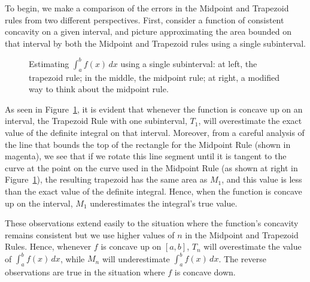 To begin, we make a comparison of the errors in the Midpoint and Trapezoid rules from two different perspectives.  First, consider a function of consistent concavity on a given interval, and picture approximating the area bounded on that interval by both the Midpoint and Trapezoid rules using a single subinterval.
\begin{figure}[h]
\begin{center}
\caption{Estimating $\int_a^b f(x) \, dx$ using a single subinterval: at left, the trapezoid rule; in the middle, the midpoint rule; at right, a modified way to think about the midpoint rule.} 
\label{F:5.6.MidVTrap}
\end{center}
\end{figure}
As seen in Figure~\ref{F:5.6.MidVTrap}, it is evident that whenever the function is concave up on an interval, the Trapezoid Rule with one subinterval, $T_1$, will overestimate the exact value of the definite integral on that interval.  Moreover, from a careful analysis of the line that bounds the top of the rectangle for the Midpoint Rule (shown in magenta), we see that if we rotate this line segment until it is tangent to the curve at the point on the curve used in the Midpoint Rule (as shown at right in Figure~\ref{F:5.6.MidVTrap}), the resulting trapezoid has the same area as $M_1$, and this value is less than the exact value of the definite integral.  Hence, when the function is concave up on the interval, $M_1$ underestimates the integral's true value.

These observations extend easily to the situation where the function's concavity remains consistent but we use higher values of $n$ in the Midpoint and Trapezoid Rules.  Hence, whenever $f$ is concave up on $[a,b]$, $T_n$ will overestimate the value of $\int_a^b f(x) \, dx$, while $M_n$ will underestimate $\int_a^b f(x) \, dx$.   The reverse observations are true in the situation where $f$ is concave down.

